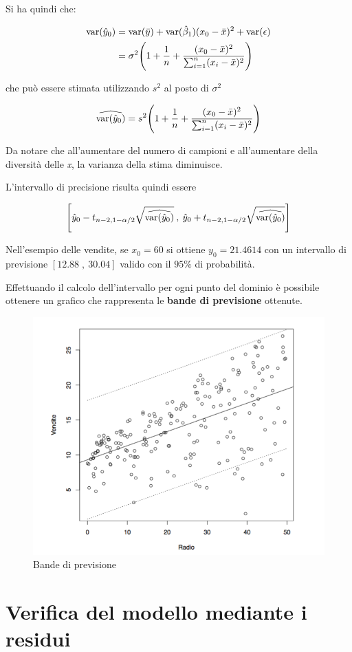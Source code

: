 Si ha quindi che:

\begin{align*}
	\text{var}(\hat{y}_0) &= \text{var}(\bar{y}) + \text{var}(\hat{\beta}_1)(x_0 - \bar{x})^2 + \text{var}(\epsilon) \\
	                         &= \sigma^2 \Bigg( 1 + \frac{1}{n} + \frac{(x_0 - \bar{x})^2}{\sum_{i=1}^{n} (x_i - \bar{x})^2 }\Bigg)
\end{align*}

che può essere stimata utilizzando $ s^2 $ al posto di $ \sigma^2 $

$$
\widehat{\text{var}(\hat{y}_0)} = s^2 \Bigg( 1 + \frac{1}{n} + \frac{(x_0 - \bar{x})^2}{\sum_{i=1}^{n} (x_i - \bar{x})^2} \Bigg)
$$

Da notare che all'aumentare del numero di campioni e all'aumentare della diversità delle \textit{x}, la varianza della stima diminuisce.

L'intervallo di precisione risulta quindi essere

$$
\Bigg[ \hat{y}_0 - t_{n-2, 1-\alpha/2}\sqrt{\widehat{\text{var}(\hat{y}_0)}} \:, \:\hat{y}_0 + t_{n-2, 1-\alpha/2}\sqrt{\widehat{\text{var}(\hat{y}_0)}}\Bigg]
$$

Nell'esempio delle vendite, se $ x_0 = 60 $ si ottiene $ y_0 = 21.4614 $ con un intervallo di previsione $ [12.88 \; , \: 30.04] $ valido con il $ 95\% $ di probabilità.

Effettuando il calcolo dell'intervallo per ogni punto del dominio è possibile ottenere un grafico che rappresenta le \textbf{bande di previsione} ottenute.

\begin{figure}[htbp]
\centering
\includegraphics[width=.5\textwidth]{./notes/immagini/l6-fig10-1.png}
\caption{Bande di previsione}
\end{figure}

\section{Verifica del modello mediante i residui}

